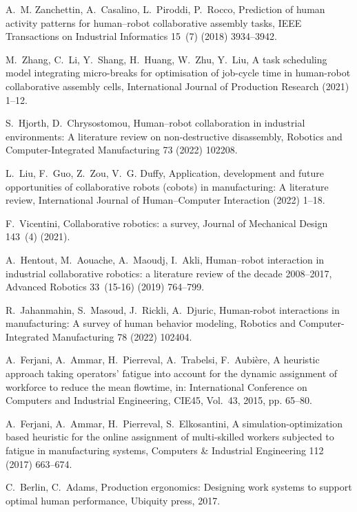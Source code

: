 \documentclass[review,12pt, 3p, times]{elsarticle}
\begin{document}
\begin{thebibliography}{10}
	A.~M. Zanchettin, A.~Casalino, L.~Piroddi, P.~Rocco, Prediction of human
	activity patterns for human--robot collaborative assembly tasks, IEEE
	Transactions on Industrial Informatics 15~(7) (2018) 3934--3942.
	
	M.~Zhang, C.~Li, Y.~Shang, H.~Huang, W.~Zhu, Y.~Liu, A task scheduling model
	integrating micro-breaks for optimisation of job-cycle time in human-robot
	collaborative assembly cells, International Journal of Production Research
	(2021) 1--12.
	
	S.~Hjorth, D.~Chrysostomou, Human--robot collaboration in industrial
	environments: A literature review on non-destructive disassembly, Robotics
	and Computer-Integrated Manufacturing 73 (2022) 102208.
	
	L.~Liu, F.~Guo, Z.~Zou, V.~G. Duffy, Application, development and future
	opportunities of collaborative robots (cobots) in manufacturing: A literature
	review, International Journal of Human--Computer Interaction (2022) 1--18.
	
	F.~Vicentini, Collaborative robotics: a survey, Journal of Mechanical Design
	143~(4) (2021).
	
	A.~Hentout, M.~Aouache, A.~Maoudj, I.~Akli, Human--robot interaction in
	industrial collaborative robotics: a literature review of the decade
	2008--2017, Advanced Robotics 33~(15-16) (2019) 764--799.
	
	R.~Jahanmahin, S.~Masoud, J.~Rickli, A.~Djuric, Human-robot interactions in
	manufacturing: {A} survey of human behavior modeling, Robotics and
	Computer-Integrated Manufacturing 78 (2022) 102404.
	
	A.~Ferjani, A.~Ammar, H.~Pierreval, A.~Trabelsi, F.~Aubi{\`e}re, A heuristic
	approach taking operators’ fatigue into account for the dynamic assignment
	of workforce to reduce the mean flowtime, in: International Conference on
	Computers and Industrial Engineering, CIE45, Vol.~43, 2015, pp. 65--80.
	
	A.~Ferjani, A.~Ammar, H.~Pierreval, S.~Elkosantini, A simulation-optimization
	based heuristic for the online assignment of multi-skilled workers subjected
	to fatigue in manufacturing systems, Computers \& Industrial Engineering 112
	(2017) 663--674.
	
	C.~Berlin, C.~Adams, Production ergonomics: Designing work systems to support
	optimal human performance, Ubiquity press, 2017.
	

\end{thebibliography}
\end{document}
